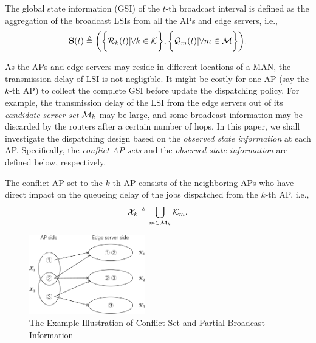 \begin{definition}
    The global state information (GSI) of the $t$-th broadcast interval is defined as the aggregation of the broadcast LSIs from all the APs and edge servers, i.e.,
    \begin{align}
        \mathbf{S}(t) \triangleq
            \bigg(
                \bigg\{\mathcal{R}_{k}(t)|\forall k\in\mathcal{K}\bigg\},
                \bigg\{\mathcal{Q}_{m}(t)|\forall m\in\mathcal{M}\bigg\}
            \bigg).
    \end{align}
\end{definition}

As the APs and edge servers may reside in different locations of a MAN, the transmission delay of LSI is not negligible.
It might be costly for one AP (say the $k$-th AP) to collect the complete GSI before update the dispatching policy.
For example, the transmission delay of the LSI from the edge servers out of its \emph{candidate server set} $\mathcal{M}_{k}$ may be large, and some broadcast information may be discarded by the routers after a certain number of hops.
In this paper, we shall investigate the dispatching design based on the \emph{observed state information} at each AP.
Specifically, the \emph{conflict AP sets} and the \emph{observed state information} are defined below, respectively.
\begin{definition}
    The conflict AP set to the $k$-th AP consists of the neighboring APs who have direct impact on the queueing delay of the jobs dispatched from the $k$-th AP, i.e.,
    \begin{align}
        \mathcal{X}_{k} \triangleq \bigcup_{m\in\mathcal{M}_{k}} \mathcal{K}_{m}.
    \end{align}
\end{definition}

\begin{figure}[tp]
    \centering
    \includegraphics[width=0.45\textwidth]{images/conflict.pdf}
    \caption{The Example Illustration of Conflict Set and Partial Broadcast Information}
    \label{fig:conflict}
\end{figure}

